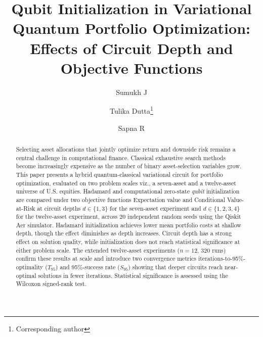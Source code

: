 \documentclass[runningheads]{llncs}
\begin{document}
\title{Qubit Initialization in Variational Quantum Portfolio Optimization: Effects of Circuit Depth and Objective Functions}

\author{Sumukh J \and
Tulika Dutta\thanks{Corresponding author} \and
Sapna R}



\maketitle

\begin{abstract}
Selecting asset allocations that jointly optimize return and downside risk remains a central challenge in computational finance. Classical exhaustive search methods become increasingly expensive as the number of binary asset-selection variables grow. This paper presents a hybrid quantum-classical variational circuit for portfolio optimization, evaluated on two problem scales viz., a seven-asset and a twelve-asset universe of U.S. equities. Hadamard and computational zero-state \emph{qubit} initialization are compared under two objective functions Expectation value and Conditional Value-at-Risk at circuit depths $d \in \{1,3\}$ for the seven-asset experiment and $d \in \{1,2,3,4\}$ for the twelve-asset experiment, across 20 independent random seeds using the Qiskit Aer simulator. Hadamard initialization achieves lower mean portfolio costs at shallow depth, though the effect diminishes as depth increases. Circuit depth has a strong effect on solution quality, while initialization does not reach statistical significance at either problem scale. The extended twelve-asset experiments ($n = 12$, 320 runs) confirm these results at scale and introduce two convergence metrics iterations-to-95\%-optimality ($T_{95}$) and 95\%-success rate ($S_{95}$) showing that deeper circuits reach near-optimal solutions in fewer iterations. Statistical significance is assessed using the Wilcoxon signed-rank test.

\end{abstract}
\end{document}
